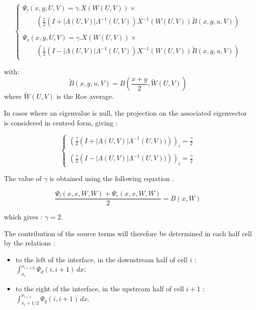 \begin{equation}
\left \lbrace
  \begin{array}{l}
    \Psi_l (x,y,U,V) = \gamma . X(W(U,V)) \times \\
    \qquad \left ( \frac{1}{2} ( I + |\Lambda(U,V)|\Lambda^{-1}(U,V) ) X^{-1}(W(U,V)) \tilde{B} (x,y,u,V) \right ) \\
    \\
    \Psi_r (x,y,U,V) = \gamma . X(W(U,V)) \times \\
    \qquad \left ( \frac{1}{2} ( I - |\Lambda(U,V)|\Lambda^{-1}(U,V) ) X^{-1}(W(U,V)) \tilde{B} (x,y,u,V) \right )
  \end{array}
 \right.
\end{equation}

with:
\begin{equation}
 \tilde{B} (x,y,u,V) = B(\frac{x+y}{2},\tilde{W}(U,V))
\end{equation}
where $\tilde{W}(U,V)$ is the Roe average.

\vspace{0.5cm}

In cases where an eigenvalue is null, the projection on the associated eigenvector is considered in centred form, giving :

\begin{equation}
\left \lbrace
  \begin{array}{l}
    \left ( \frac{\gamma}{2} \left ( I + |\Lambda(U,V)|\Lambda^{-1}(U,V)) \right ) \right )_i = \frac{\gamma}{2} \\
    \\
    \left ( \frac{\gamma}{2} \left ( I - |\Lambda(U,V)|\Lambda^{-1}(U,V)) \right ) \right )_i = \frac{\gamma}{2}
  \end{array}
 \right.
\end{equation}

\vspace{0.5cm}

The value of $\gamma$ is obtained using the following equation \cite{VAZQUEZ94}.

\begin{equation}
 \frac{\Psi_l (x,x,W,W) + \Psi_r (x,x,W,W)}{2} = B(x,W)
\end{equation}

which gives : $\gamma = 2$.

\vspace{0.5cm}

The contribution of the source terms will therefore be determined in each half cell by the relations :
\begin{itemize}
 \item to the left of the interface, in the downstream half of cell $i$ :  \\ $\int_{x_i}^{x_{i+1/2}} \Psi_d (i,i+1)\, dx$;
 \item to the right of the interface, in the upstream half of cell $i+1$ : \\ $\int_{x_i+1/2}^{x_{i+1}} \Psi_g (i,i+1)\, dx$.
\end{itemize}

